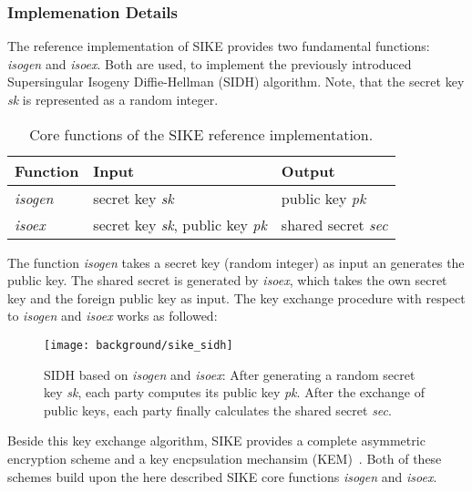 \subsubsection{Implemenation Details}

The reference implementation of SIKE \parencite{sike2020spec} provides two fundamental functions: \textit{isogen} and \textit{isoex}. Both are used, to implement the previously introduced Supersingular Isogeny Diffie-Hellman (SIDH) algorithm. Note, that the secret key \textit{sk} is represented as a random integer.
\\

\begin{table}[htpb]
  \centering
  \begin{tabular}{|K{3cm}|K{3cm}|K{4cm}|}
	\hline
      \textbf{Function} & \textbf{Input} & \textbf{Output} \\
	\hline
      \textit{isogen} & secret key \textit{sk} & public key \textit{pk} \\
     \hline
      \textit{isoex} & secret key \textit{sk}, public key \textit{pk} & shared secret \textit{sec}\\
     \hline
  \end{tabular}
   \caption[Core functions of the SIKE reference implementation]{Core functions of the SIKE reference implementation.}\label{tab:sike_core_functions}
\end{table}

The function \textit{isogen} takes a secret key (random integer) as input an generates the public key. The shared secret is generated by \textit{isoex}, which takes the own secret key and the foreign public key as input. The key exchange procedure with respect to \textit{isogen} and \textit{isoex} works as followed:


\begin{figure}[htpb]
  \centering
  \texttt{[image: background/sike\_sidh]}
  \caption[SIDH based on \textit{isogen} and \textit{isoex}]{SIDH based on \textit{isogen} and \textit{isoex}: After generating a random secret key \textit{sk}, each party computes its public key \textit{pk}. After the exchange of public keys, each party finally calculates the shared secret \textit{sec}.} \label{fig:sike-sidh}
\end{figure}
Beside this key exchange algorithm, SIKE provides a complete asymmetric encryption scheme and a key encpsulation mechansim (KEM)~\parencite{sike2020spec}. 
Both of these schemes build upon the here described SIKE core functions \textit{isogen} and \textit{isoex}.

